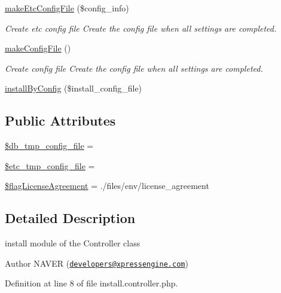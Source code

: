 \begin{DoxyCompactItemize}
\hyperlink{classinstallController_a87b331e263614e15c5366284648f6ee0}{make\+Etc\+Config\+File} (\$config\+\_\+info)
\begin{DoxyCompactList}\small\item\em Create etc config file Create the config file when all settings are completed. \end{DoxyCompactList}\item 
\hyperlink{classinstallController_a1ccad92dd450d67e90a2efdde0f6b78a}{make\+Config\+File} ()
\begin{DoxyCompactList}\small\item\em Create config file Create the config file when all settings are completed. \end{DoxyCompactList}\item 
\hyperlink{classinstallController_a4ec44b3090b73660ba018945c2ffa239}{install\+By\+Config} (\$install\+\_\+config\+\_\+file)
\end{DoxyCompactItemize}
\subsection*{Public Attributes}
\begin{DoxyCompactItemize}
\item 
\hyperlink{classinstallController_a1d32cf378279cb2b7d388b8a7e88c7aa}{\$db\+\_\+tmp\+\_\+config\+\_\+file} = \textquotesingle{}\textquotesingle{}
\item 
\hyperlink{classinstallController_a8e090f5c9a9844fbd8b4f0855a52dc43}{\$etc\+\_\+tmp\+\_\+config\+\_\+file} = \textquotesingle{}\textquotesingle{}
\item 
\hyperlink{classinstallController_af1f7a5fe91be6a576cdffcc07cba5be8}{\$flag\+License\+Agreement} = \textquotesingle{}./files/env/license\+\_\+agreement\textquotesingle{}
\end{DoxyCompactItemize}


\subsection{Detailed Description}
install module of the Controller class 

\begin{DoxyAuthor}{Author}
N\+A\+V\+ER (\href{mailto:developers@xpressengine.com}{\tt developers@xpressengine.\+com}) 
\end{DoxyAuthor}


Definition at line 8 of file install.\+controller.\+php.



